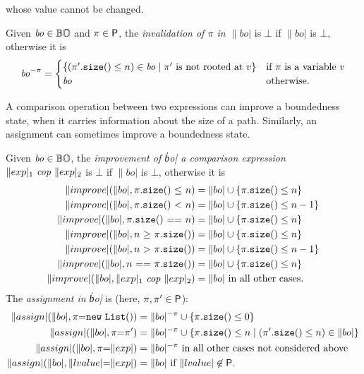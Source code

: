 whose value cannot be changed.
%
\begin{definition}\label{def:invalidation}
  Given $\|bo|\in\bo$ and $\pi\in\mathsf{P}$, the \emph{invalidation of $\pi$ in $\|bo|$}
  is $\bot$ if $\|bo|$ is $\bot$, otherwise it is
  \[
  \|bo|^{-\pi}=\begin{cases}
  \{(\size{\pi'}\le n)\in\|bo|\mid\pi'\text{ is not rooted at }v\} & \text{if $\pi$ is a variable $v$}\\
  \|bo| & \text{otherwise.}
  \end{cases}
  \]
\end{definition}
%
A comparison operation between two expressions can improve a boundedness state,
when it carries information about the size of a path.
Similarly, an assignment can sometimes improve a boundedness state.
%
\begin{definition}\label{def:improvement}
  Given $\|bo|\in\bo$, the
  \emph{improvement of \|bo| \wrt a comparison expression $\cop{\exp_1}{\exp_2}$}
  is $\bot$ if $\|bo|$ is $\bot$, otherwise it is
  \begin{align*}
    \|improve|(\|bo|,\copfull{\size{\pi}}{\le}{n})&=\|bo|\cup\{\size{\pi}\le n\}\\
    \|improve|(\|bo|,\copfull{\size{\pi}}{<}{n})&=\|bo|\cup\{\size{\pi}\le n-1\}\\
    \|improve|(\|bo|,\copfull{\size{\pi}}{==}{n})&=\|bo|\cup\{\size{\pi}\le n\}\\
    \|improve|(\|bo|,\copfull{n}{\ge}{\size{\pi}})&=\|bo|\cup\{\size{\pi}\le n\}\\
    \|improve|(\|bo|,\copfull{n}{>}{\size{\pi}})&=\|bo|\cup\{\size{\pi}\le n-1\}\\
    \|improve|(\|bo|,\copfull{n}{==}{\size{\pi}})&=\|bo|\cup\{\size{\pi}\le n\}\\
    \|improve|(\|bo|,\cop{\exp_1}{\exp_2})&=\|bo|\text{ in all other cases.}
  \end{align*}
  The \emph{assignment in \|bo|} is (here, $\pi,\pi'\in\mathsf{P}$):
  \begin{align*}
    \|assign|(\|bo|,\assign{\pi}{\new{\mathtt{List}}{}})&=\|bo|^{-\pi}\cup\{\size{\pi}\le 0\}\\
    \|assign|(\|bo|,\assign{\pi}{\pi'})&=\|bo|^{-\pi}\cup\{\size{\pi}\le n\mid(\size{\pi'}\le n)\in\|bo|\}\\
    \|assign|(\|bo|,\assign{\pi}{\exp})&=\|bo|^{-\pi}\text{ in all other cases not considered above}\\
    \|assign|(\|bo|,\assign{\lvalue}{\exp})&=\|bo|\text{ if $\lvalue\not\in\paths$.}
  \end{align*}
\end{definition}

